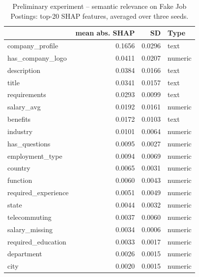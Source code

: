 \begin{table}
\centering
\caption{Preliminary experiment -- semantic relevance on Fake Job Postings: top-20 SHAP features, averaged over three seeds.}
\label{tab:preliminary_fake_jobs}
\begin{tabular}{lrrl}
\toprule
 & \bfseries mean abs. SHAP & \bfseries SD & \bfseries Type \\
\midrule
company\_profile & 0.1656 & 0.0296 & text \\
has\_company\_logo & 0.0411 & 0.0207 & numeric \\
description & 0.0384 & 0.0166 & text \\
title & 0.0341 & 0.0157 & text \\
requirements & 0.0293 & 0.0099 & text \\
salary\_avg & 0.0192 & 0.0161 & numeric \\
benefits & 0.0172 & 0.0103 & text \\
industry & 0.0101 & 0.0064 & numeric \\
has\_questions & 0.0095 & 0.0027 & numeric \\
employment\_type & 0.0094 & 0.0069 & numeric \\
country & 0.0065 & 0.0031 & numeric \\
function & 0.0060 & 0.0043 & numeric \\
required\_experience & 0.0051 & 0.0049 & numeric \\
state & 0.0044 & 0.0032 & numeric \\
telecommuting & 0.0037 & 0.0060 & numeric \\
salary\_missing & 0.0034 & 0.0006 & numeric \\
required\_education & 0.0033 & 0.0017 & numeric \\
department & 0.0026 & 0.0015 & numeric \\
city & 0.0020 & 0.0015 & numeric \\
\bottomrule
\end{tabular}
\end{table}

